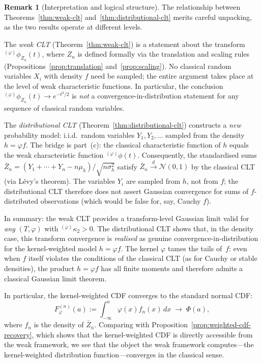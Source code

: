 \documentclass[12pt]{article}
\theoremstyle{definition}
\newtheorem{remark}[theorem]{Remark}
\begin{document}
\begin{remark}[Interpretation and logical structure]
\label{rem:distributional-clt-interp}
The relationship between Theorems~\ref{thm:weak-clt}
and~\ref{thm:distributional-clt} merits careful unpacking, as the two
results operate at different levels.

The \emph{weak CLT} (Theorem~\ref{thm:weak-clt}) is a statement about
the transform ${}^{(\varphi)}\phi_{Z_n}(t)$, where $Z_n$ is defined
formally via the translation and scaling rules
(Propositions~\ref{prop:translation} and~\ref{prop:scaling}).  No
classical random variables $X_i$ with density $f$ need be sampled;
the entire argument takes place at the level of weak characteristic
functions.  In particular, the conclusion
${}^{(\varphi)}\phi_{Z_n}(t)\to e^{-t^2/2}$ is \emph{not} a
convergence-in-distribution statement for any sequence of classical
random variables.

The \emph{distributional CLT} (Theorem~\ref{thm:distributional-clt})
constructs a \emph{new} probability model: i.i.d.\ random variables
$Y_1,Y_2,\ldots$ sampled from the density $h=\varphi f$.  The bridge
is part~(c): the classical characteristic function of $h$ equals
the weak characteristic function ${}^{(\varphi)}\phi(t)$.
Consequently, the standardised sums
$\bar{Z}_n=(Y_1+\cdots+Y_n-n\mu_h)/\sqrt{n\sigma_h^2}$ satisfy
$\bar{Z}_n\xrightarrow{d}\mathcal{N}(0,1)$ by the classical CLT
(via L\'evy's theorem).  The variables $Y_i$ are sampled from $h$,
not from $f$; the distributional CLT therefore does not assert
Gaussian convergence for sums of $f$-distributed observations
(which would be false for, say, Cauchy $f$).

In summary: the weak CLT provides a transform-level Gaussian limit
valid for \emph{any} $(T,\varphi)$ with ${}^{(\varphi)}\kappa_2>0$.
The distributional CLT shows that, in the density case, this
transform convergence is \emph{realised} as genuine
convergence-in-distribution for the kernel-weighted model $h=\varphi
f$.  The kernel $\varphi$ tames the tails of~$f$: even when $f$
itself violates the conditions of the classical CLT (as for Cauchy
or stable densities), the product $h=\varphi f$ has all finite
moments and therefore admits a classical Gaussian limit theorem.

In particular, the kernel-weighted CDF converges to the standard normal
CDF:
\[
F_\varphi^{(n)}(a)
:=
\int_{-\infty}^{a}\varphi(x) f_n(x)\,dx
\;\longrightarrow\;
\Phi(a),
\]
where $f_n$ is the density of $\bar{Z}_n$.  Comparing with
Proposition~\ref{prop:weighted-cdf-recovery}, which shows that the
kernel-weighted CDF is directly accessible from the weak framework, we
see that the object the weak framework computes---the kernel-weighted
distribution function---converges in the classical sense.
\end{remark}
\end{document}

